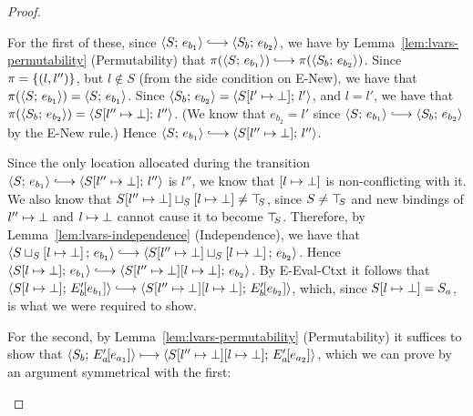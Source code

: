 \begin{proof}
\begin{enumerate}
\begin{enumerate}
\begin{itemize}
          For the first of these, since $\config{S}{e_{b_1}}
          \parstepsto \config{S_b}{e_{b_2}}$, we have by
          Lemma~\ref{lem:lvars-permutability} (Permutability) that
          $\pi(\config{S}{e_{b_1}}) \parstepsto
          \pi(\config{S_b}{e_{b_2}})$.  Since $\pi = \left\{(l,
            l'')\right\}$, but $l \notin S$ (from the side condition on {\sc
            E-New}), we have that $\pi(\langle S;\, e_{b_1} \rangle) =
          \langle S;\, e_{b_1} \rangle$. Since $\langle S_b;\, e_{b_2} \rangle =
          \langle S[l' \mapsto \bot];\, l' \rangle$, and $l = l'$, we have
          that $\pi(\langle S_b;\, e_{b_2} \rangle) =
          \langle S[l'' \mapsto \bot];\, l'' \rangle$.  (We know that
          $e_{b_2} = l'$ since $\config{S}{e_{b_1}} \parstepsto
          \config{S_b}{e_{b_2}}$ by the {\sc E-New} rule.)  Hence
          $\config{S}{e_{b_1}} \parstepsto
          \config{\extSRaw{S}{l''}{\bot}}{l''}$.

          Since the only location allocated during the transition
          $\config{S}{e_{b_1}} \parstepsto
          \config{\extSRaw{S}{l''}{\bot}}{l''}$ is $l''$, we know that
          $\left[ l \mapsto \bot \right]$ is non-conflicting with
          it.  We also know that
          $S[l'' \mapsto \bot] \sqcup_{S} \left[ l \mapsto \bot \right]
          \neq \top\hspace{-0.85mm}_{S}$, since $S \neq \top\hspace{-0.85mm}_{S}$ and new bindings of
          $l'' \mapsto \bot$ and
          $l \mapsto \bot$ cannot cause it to become
          $\top\hspace{-0.85mm}_{S}$.  Therefore, by Lemma~\ref{lem:lvars-independence}
          (Independence), we have that
          $\config{\lubstore{S}{\store{\storebindingRaw{l}{\bot}}}}{e_{b_1}}
          \parstepsto
          \config{\lubstore{\extSRaw{S}{l''}{\bot}}{\store{\storebindingRaw{l}{\bot}}}}{e_{b_2}}$.
          Hence $\config{\extSRaw{S}{l}{\bot}}{e_{b_1}} \parstepsto
          \config{\extSRaw{\extSRaw{S}{l''}{\bot}}{l}{\bot}}{e_{b_2}}$.
          By {\sc E-Eval-Ctxt} it follows that
          $\config{\extSRaw{S}{l}{\bot}}{\evalctxt{E'_b}{e_{b_1}}}
          \parstepsto
          \config{\extSRaw{\extSRaw{S}{l''}{\bot}}{l}{\bot}}{\evalctxt{E'_b}{e_{b_2}}}$,
          which, since $S[l \mapsto \bot] = S_a$, is what we were
          required to show.

          For the second, by Lemma~\ref{lem:lvars-permutability}
          (Permutability) it suffices to show that
          $\langle S_b;\, E'_a\hspace{-1mm}\left[e_{a_1}\right] \rangle \longmapsto
          \langle S[l'' \mapsto \bot][l \mapsto \bot];\, E'_a\hspace{-1mm}\left[e_{a_2}\right] \rangle$,
          which we can prove by an argument symmetrical with the
          first:


\end{itemize}
\end{enumerate}
\end{enumerate}
\end{proof}
